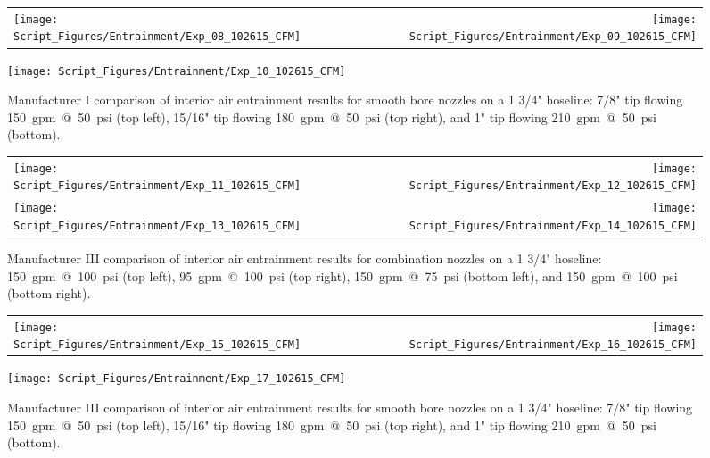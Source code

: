 \documentclass[12pt,oneside]{book}
\begin{document}
\begin{figure}[!ht]
\begin{tabular*}{\textwidth}{lr}
\texttt{[image: Script\_Figures/Entrainment/Exp\_08\_102615\_CFM]} &
\texttt{[image: Script\_Figures/Entrainment/Exp\_09\_102615\_CFM]} \\
\end{tabular*}
\centering
\texttt{[image: Script\_Figures/Entrainment/Exp\_10\_102615\_CFM]} 
\caption{Manufacturer I comparison of interior air entrainment results for smooth bore nozzles on a 1 3/4" hoseline: 7/8" tip flowing 150~gpm~@~50~psi (top left), 15/16" tip flowing 180~gpm~@~50~psi (top right), and 1" tip flowing 210~gpm~@~50~psi (bottom).}
\label{fig:1_5_Interior_Smooth_Bore_Manufacturer_I}
\end{figure}

\clearpage

\begin{figure}[!ht]
\begin{tabular*}{\textwidth}{lr}
\texttt{[image: Script\_Figures/Entrainment/Exp\_11\_102615\_CFM]} &
\texttt{[image: Script\_Figures/Entrainment/Exp\_12\_102615\_CFM]} \\
\texttt{[image: Script\_Figures/Entrainment/Exp\_13\_102615\_CFM]} &
\texttt{[image: Script\_Figures/Entrainment/Exp\_14\_102615\_CFM]} \\
\end{tabular*}
\caption{Manufacturer III comparison of interior air entrainment results for combination nozzles on a 1 3/4" hoseline: 150~gpm~@~100~psi (top left), 95~gpm~@~100~psi (top right), 150~gpm~@~75~psi (bottom left), and 150~gpm~@~100~psi (bottom right).}
\label{fig:1_5_Interior_Combination_Manufacturer_III}
\end{figure}

\clearpage

\begin{figure}[!ht]
\begin{tabular*}{\textwidth}{lr}
\texttt{[image: Script\_Figures/Entrainment/Exp\_15\_102615\_CFM]} &
\texttt{[image: Script\_Figures/Entrainment/Exp\_16\_102615\_CFM]} \\
\end{tabular*}
\centering
\texttt{[image: Script\_Figures/Entrainment/Exp\_17\_102615\_CFM]} 
\caption{Manufacturer III comparison of interior air entrainment results for smooth bore nozzles on a 1 3/4" hoseline: 7/8" tip flowing 150~gpm~@~50~psi (top left), 15/16" tip flowing 180~gpm~@~50~psi (top right), and 1" tip flowing 210~gpm~@~50~psi (bottom).}
\label{fig:1_5_Interior_Smooth_Bore_Manufacturer_III}
\end{figure}
\end{document}
